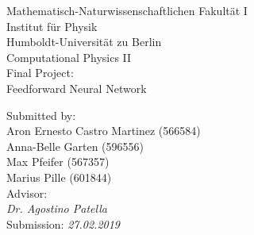 \begin{titlepage}
\begin{center}
Mathematisch-Naturwissenschaftlichen Fakultät I\\
Institut für Physik\\
Humboldt-Universität zu Berlin\\
\vspace{2cm}
\LARGE Computational Physics II\\
Final Project:\\
\LARGE Feedforward Neural Network
\vspace{2cm}
\end{center}
Submitted by:\\
Aron Ernesto Castro Martinez (566584)\\
Anna-Belle Garten (596556)\\
Max Pfeifer (567357)\\
Marius Pille (601844)
\\[1cm]

\noindent Advisor:\\
\hspace*{0.5cm} \textit{Dr. Agostino Patella}
\\[1cm]
Submission: \hspace*{0.5cm}  \textit{27.02.2019}

\end{titlepage}
